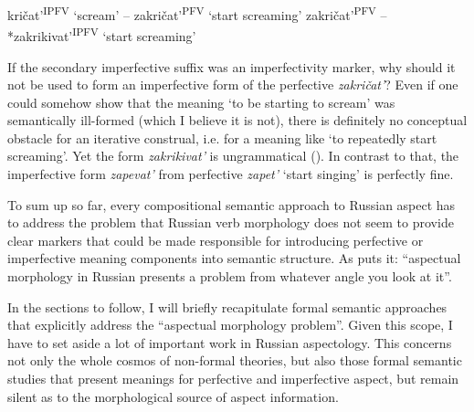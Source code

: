 \documentclass[output=paper,colorlinks,citecolor=brown]{langscibook}
\begin{document}
\ea\label{poplakivat}
\ea kričat'\textsuperscript{IPFV} `scream' -- zakričat'\textsuperscript{PFV} `start screaming'
\ex zakričat'\textsuperscript{PFV} -- *zakrikivat'\textsuperscript{IPFV} `start screaming'
\z\z

\noindent If the secondary imperfective suffix was an imperfectivity marker, why should it not be used to form an imperfective form of the perfective \textit{zakričat'}?
Even if one could somehow show that the meaning `to be starting to scream' was semantically ill-formed (which I believe it is not), there is definitely no conceptual obstacle for an iterative construal, i.e. for a meaning like `to repeatedly start screaming'. Yet the form \textit{zakrikivat'} is ungrammatical (\citealt[63]{Tatevo13}). In contrast to that, the imperfective form \textit{zapevat'} from perfective \textit{zapet'} `start singing' is perfectly fine. 

To sum up so far, every compositional semantic approach to Russian aspect has to address the problem that Russian verb morphology does not seem to provide clear markers that could be made responsible for introducing perfective or imperfective meaning components into semantic structure. 
As \citet[153]{Schoorlemmer1995} puts it: ``aspectual morphology in Russian presents a problem from whatever angle you look at it''. 

In the sections to follow, I will briefly recapitulate formal semantic approaches that explicitly address the ``aspectual morphology problem''. Given this scope, I have to set aside a lot of important work
in Russian aspectology. This concerns not only the whole cosmos of non-formal theories, but also those formal semantic studies that present meanings for perfective and imperfective aspect, but remain silent as to the morphological source of aspect information.
\end{document}
